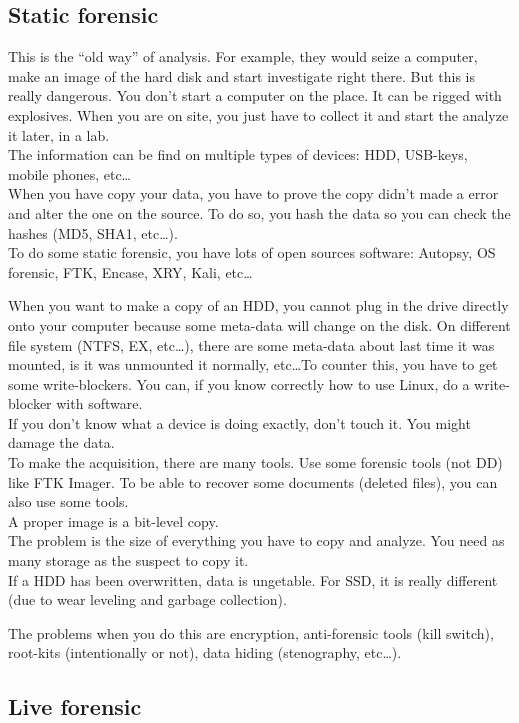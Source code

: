 \subsection{Static forensic}
This is the \enquote{old way} of analysis. For example, they would seize a computer, make an image of the hard disk and start investigate right there. But this is really dangerous. You don't start a computer on the place. It can be rigged with explosives. When you are on site, you just have to collect it and start the analyze it later, in a lab.\\
The information can be find on multiple types of devices: HDD, USB-keys, mobile phones, etc\ldots\\
When you have copy your data, you have to prove the copy didn't made a error and alter the one on the source. To do so, you hash the data so you can check the hashes (MD5, SHA1, etc\ldots).\\
To do some static forensic, you have lots of open sources software: Autopsy, OS forensic, FTK, Encase, XRY, Kali, etc\ldots\\\par
When you want to make a copy of an HDD, you cannot plug in the drive directly onto your computer because some meta-data will change on the disk. On different file system (NTFS, EX, etc\ldots), there are some meta-data about last time it was mounted, is it was unmounted it normally, etc\ldots To counter this, you have to get some write-blockers. You can, if you know correctly how to use Linux, do a write-blocker with software.\\
If you don't know what a device is doing exactly, don't touch it. You might damage the data.\\
To make the acquisition, there are many tools. Use some forensic tools (not DD) like FTK Imager. To be able to recover some documents (deleted files), you can also use some tools.\\
A proper image is a bit-level copy.\\
The problem is the size of everything you have to copy and analyze. You need as many storage as the suspect to copy it.\\
If a HDD has been overwritten, data is ungetable. For SSD, it is really different (due to wear leveling and garbage collection).\\\par
The problems when you do this are encryption, anti-forensic tools (kill switch), root-kits (intentionally or not), data hiding (stenography, etc\ldots).
\subsection{Live forensic}